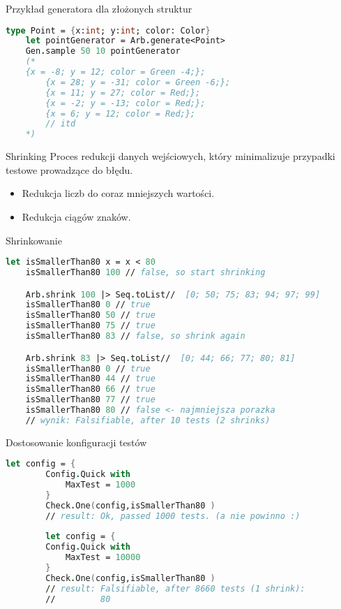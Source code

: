     \begin{frame}[fragile]{Przykład generatora dla złożonych struktur}
    \begin{lstlisting}[language=FSharp, xleftmargin=-10pt,xrightmargin=-10pt,numbers=none]
    type Point = {x:int; y:int; color: Color}
    let pointGenerator = Arb.generate<Point>
    Gen.sample 50 10 pointGenerator
    (*
    {x = -8; y = 12; color = Green -4;};
        {x = 28; y = -31; color = Green -6;};
        {x = 11; y = 27; color = Red;};
        {x = -2; y = -13; color = Red;};
        {x = 6; y = 12; color = Red;};
        // itd
    *)
    \end{lstlisting}
    \end{frame}
    
    \begin{frame}[fragile]{Shrinking}
    Proces redukcji danych wejściowych, który minimalizuje przypadki testowe prowadzące do błędu.
    \begin{itemize}
        \item Redukcja liczb do coraz mniejszych wartości.
        \item Redukcja ciągów znaków.
    \end{itemize}
    \end{frame}
    
    \begin{frame}[fragile]{Shrinkowanie}
        \begin{lstlisting}[language=FSharp, xleftmargin=-10pt,xrightmargin=-10pt,numbers=none,basicstyle=\ttfamily\small]
    let isSmallerThan80 x = x < 80
    isSmallerThan80 100 // false, so start shrinking

    Arb.shrink 100 |> Seq.toList//  [0; 50; 75; 83; 94; 97; 99]
    isSmallerThan80 0 // true
    isSmallerThan80 50 // true
    isSmallerThan80 75 // true
    isSmallerThan80 83 // false, so shrink again

    Arb.shrink 83 |> Seq.toList//  [0; 44; 66; 77; 80; 81]
    isSmallerThan80 0 // true
    isSmallerThan80 44 // true
    isSmallerThan80 66 // true
    isSmallerThan80 77 // true
    isSmallerThan80 80 // false <- najmniejsza porazka
    // wynik: Falsifiable, after 10 tests (2 shrinks)
        \end{lstlisting}
    \end{frame}
    
    \begin{frame}[fragile]{Dostosowanie konfiguracji testów}
    \begin{lstlisting}[language=FSharp, xleftmargin=-10pt,xrightmargin=-10pt,numbers=none]
    let config = {
        Config.Quick with
            MaxTest = 1000
        }
        Check.One(config,isSmallerThan80 )
        // result: Ok, passed 1000 tests. (a nie powinno :)
        
        let config = {
        Config.Quick with
            MaxTest = 10000
        }
        Check.One(config,isSmallerThan80 )
        // result: Falsifiable, after 8660 tests (1 shrink):
        //         80
    \end{lstlisting}
    \end{frame}
    
